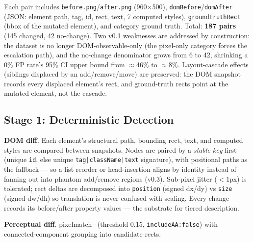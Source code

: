 \documentclass[10pt,twocolumn,letterpaper]{article}
\begin{document}
Each pair includes \texttt{before.png}/\texttt{after.png} (960$\times$500), \texttt{domBefore}/\texttt{domAfter} (JSON: element path, tag, id, rect, text, 7 computed styles), \texttt{groundTruthRect} (bbox of the mutated element), and category ground truth. Total: \textbf{187 pairs} (145 changed, 42 no-change). Two v0.1 weaknesses are addressed by construction: the dataset is no longer DOM-observable-only (the pixel-only category forces the escalation path), and the no-change denominator grows from 6 to 42, shrinking a 0\% FP rate's 95\% CI upper bound from ${\approx}$46\% to ${\approx}$8\%. Layout-cascade effects (siblings displaced by an add/remove/move) are preserved: the DOM snapshot records every displaced element's rect, and ground-truth rects point at the mutated element, not the cascade.

\subsection{Stage 1: Deterministic Detection}

\textbf{DOM diff}. Each element's structural path, bounding rect, text, and computed styles are compared between snapshots. Nodes are paired by a \textit{stable key} first (unique \texttt{id}, else unique \texttt{tag|className|text} signature), with positional paths as the fallback — so a list reorder or head-insertion aligns by identity instead of fanning out into phantom add/remove regions (v0.3). Sub-pixel jitter ($<$1px) is tolerated; rect deltas are decomposed into \texttt{position} (signed dx/dy) vs \texttt{size} (signed dw/dh) so translation is never confused with scaling. Every change records its before/after property values — the substrate for tiered description.

\textbf{Perceptual diff}. pixelmatch~\cite{pixelmatch} (threshold 0.15, \texttt{includeAA:false}) with connected-component grouping into candidate rects.
\end{document}
